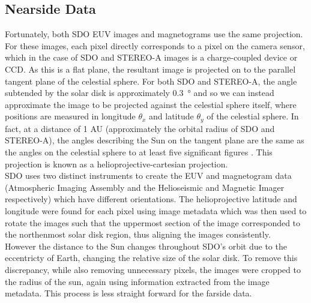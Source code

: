 \documentclass[11pt,a4paper,onecolumn]{report}
\begin{document}
\subsection{Nearside Data}
Fortunately,  both SDO EUV images and magnetograms use the same
projection. For these images, each pixel directly corresponds to a pixel
on the camera sensor, which in the case of SDO and STEREO-A images is a
charge-coupled device or CCD. As this is a flat plane, the resultant image is
projected on to the parallel tangent plane of the celestial sphere.
For both SDO and STEREO-A, the angle subtended by the solar disk is
approximately \SI[]{0.3}[]{\degree} and so we can instead approximate the image
to be projected against the celestial sphere itself, where positions are
measured in longitude \(\theta_x\) and latitude \(\theta_y\) of the celestial
sphere. %
In fact, at a distance of 1 AU (approximately the orbital radius of SDO and
STEREO-A), the angles describing the Sun on the tangent plane are the same as
the angles on the celestial sphere to at least five significant figures
\citep{thompson_w_t_coordinate_2006}. This projection is known as a
helioprojective-cartesian projection.\\

SDO uses two distinct instruments to create the EUV and magnetogram data
(Atmospheric Imaging Assembly \citep{lemen_atmospheric_2012} and the
Helioseismic and Magnetic Imager \citep{scherrer_helioseismic_2012}
respectively) which have different orientations. The helioprojective latitude
and longitude were found for each pixel using image metadata which was then used
to rotate the images such that the uppermost section of the image corresponded to
the northenmost solar disk region, thus aligning the images consistently.\\

However the distance to the Sun changes throughout SDO's orbit due to the
eccentricty of Earth, changing the relative size of the solar disk. To remove
this discrepancy, while also removing unnecessary pixels, the images were
cropped to the radius of the sun, again using information extracted from the
image metadata. This process is less straight forward for the farside data.
\end{document}
